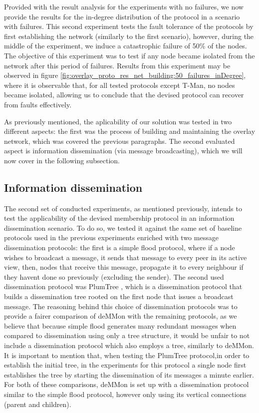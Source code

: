 Provided with the result analysis for the experiments with no failures, we now provide the results for the in-degree distribution of the protocol in a scenario with failures. This second experiment tests the fault tolerance of the protocols by first establishing the network (similarly to the first scenario), however, during the middle of the experiment, we induce a catastrophic failure of 50\% of the nodes. The objective of this experiment was to test if any node became isolated from the network after this period of failures. Results from this experiment may be observed in figure \ref{fig:overlay_proto_res_net_building:50_failures_inDegree}, where it is observable that, for all tested protocols except T-Man, no nodes became isolated, allowing us to conclude that the devised protocol can recover from faults effectively.

As previously mentioned, the aplicability of our solution was tested in two different aspects: the first was the process of building and maintaining the overlay network, which was covered the previous paragraphs. The second evaluated aspect is information dissemination (via message broadcasting), which we will now cover in the following subsection.


\subsection{Information dissemination}

The second set of conducted experiments, as mentioned previously, intends to test the applicability of the devised membership protocol in an information dissemination scenario. To do so, we tested it against the same set of baseline protocols used in the previous experiments enriched with two message dissemination protocols: the first is a simple flood protocol, where if a node wishes to broadcast a message, it sends that message to every peer in its active view, then, nodes that receive this message, propagate it to every neighbour if they havent done so previously (excluding the sender). The second used dissemination protocol was PlumTree , which is a dissemination protocol that builds a dissemination tree rooted on the first node that issues a broadcast message. The reasoning behind this choice of dissemination protocols was to provide a fairer comparison of deMMon with the remaining protocols, as we believe that because simple flood generates many redundant messages when compared to dissemination using only a tree structure, it would be unfair to not include a dissemination protocol which also employs a tree, similarly to deMMon. It is important to mention that, when testing the PlumTree protocol,in order to establish the initial tree, in the experiments for this protocol a single node first establishes the tree by starting the dissemination of its messages a minute earlier. For both of these comparisons, deMMon is set up with a dissemination protocol similar to the simple flood protocol, however only using its vertical connections (parent and children).

